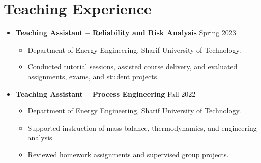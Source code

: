 \documentclass[letter,20pt]{article}
\begin{document}

\section{\textbf{Teaching Experience}}

\vspace{5pt}



\begin{itemize}
[
noitemsep,
topsep=5pt,
leftmargin=0ex
]


\item[]
\textbf{
Teaching Assistant -- Reliability and Risk Analysis
}
\hfill
Spring 2023


\begin{itemize}
[
noitemsep,
leftmargin=4ex
]

\item
Department of Energy Engineering, Sharif University of Technology.

\item
Conducted tutorial sessions, assisted course delivery, and evaluated assignments, exams, and student projects.

\end{itemize}



\vspace{8pt}



\item[]
\textbf{
Teaching Assistant -- Process Engineering
}
\hfill
Fall 2022


\begin{itemize}
[
noitemsep,
leftmargin=4ex
]

\item
Department of Energy Engineering, Sharif University of Technology.

\item
Supported instruction of mass balance, thermodynamics, and engineering analysis.

\item
Reviewed homework assignments and supervised group projects.

\end{itemize}



\vspace{8pt}




\end{itemize}
\end{document}
